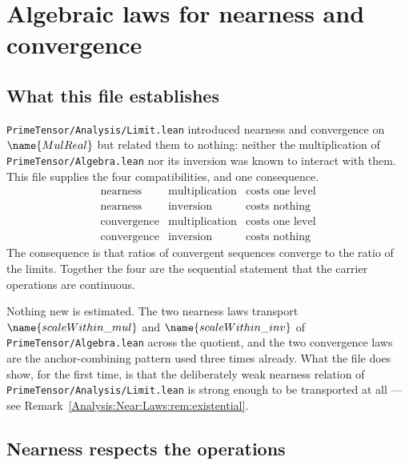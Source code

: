 
\section{Algebraic laws for nearness and convergence}
\label{Analysis:Near:Laws:sec}


\subsection*{What this file establishes}

\texttt{PrimeTensor/Analysis/Limit.lean} introduced nearness and convergence on
$\name{MulReal}$ but related them to nothing: neither the multiplication of
\texttt{PrimeTensor/Algebra.lean} nor its inversion was known to interact with
them.  This file supplies the four compatibilities, and one consequence.
\[
  \begin{array}{lll}
    \text{nearness} & \text{multiplication} &
      \text{costs one level} \\
    \text{nearness} & \text{inversion} &
      \text{costs nothing} \\
    \text{convergence} & \text{multiplication} &
      \text{costs one level} \\
    \text{convergence} & \text{inversion} &
      \text{costs nothing}
  \end{array}
\]
The consequence is that ratios of convergent sequences converge to the ratio of
the limits.  Together the four are the sequential statement that the carrier
operations are continuous.

Nothing new is estimated.  The two nearness laws transport
$\name{scaleWithin\_mul}$ and $\name{scaleWithin\_inv}$ of
\texttt{PrimeTensor/Algebra.lean} across the quotient, and the two convergence
laws are the anchor-combining pattern used three times already.  What the file
does show, for the first time, is that the deliberately weak nearness relation
of \texttt{PrimeTensor/Analysis/Limit.lean} is strong enough to be transported
at all --- see Remark~\ref{Analysis:Near:Laws:rem:existential}.

\subsection{Nearness respects the operations}

